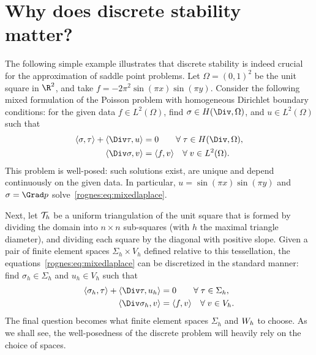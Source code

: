 \section{Why does discrete stability matter?}
\label{rognes:sec:motivation}

The following simple example illustrates that discrete stability is
indeed crucial for the approximation of saddle point problems. Let
$\Omega = (0, 1)^2$ be the unit square in $\R^2$, and take $f = - 2
\pi^2 \sin(\pi x) \sin(\pi y)$. Consider the following mixed
formulation of the Poisson problem with homogeneous Dirichlet boundary
conditions: for the given data $f \in L^2(\Omega)$, find $\sigma \in
H(\Div, \Omega)$, and $u \in L^2(\Omega)$ such that
\begin{equation}
  \label{rognes:eq:mixedlaplace}
  \begin{split}
    \langle \sigma, \tau \rangle + \langle \Div \tau, u \rangle &= 0
    \quad\quad \foralls \tau \in H(\Div, \Omega), \\
    \langle \Div \sigma, v \rangle &= \langle f, v \rangle
    \quad \foralls v \in L^2(\Omega).
  \end{split}
\end{equation}
This problem is well-posed: such solutions exist, are unique and
depend continuously on the given data. In particular, $u = \sin(\pi x)
\sin(\pi y)$ and $\sigma = \Grad p$
solve~\eqref{rognes:eq:mixedlaplace}.

Next, let $\mathcal{T}_h$ be a uniform triangulation of the unit square
that is formed by dividing the domain into $n \times n$ sub-squares
(with $h$ the maximal triangle diameter), and dividing each square by
the diagonal with positive slope. Given a pair of finite element
spaces $\Sigma_h \times V_h$ defined relative to this tessellation,
the equations~\eqref{rognes:eq:mixedlaplace} can be discretized in the
standard manner: find $\sigma_h \in \Sigma_h$ and $u_h \in V_h$ such
that
\begin{equation}
  \label{rognes:eq:mixedlaplace:discrete}
  \begin{split}
    \langle \sigma_h, \tau \rangle + \langle \Div \tau, u_h \rangle &= 0
    \quad\quad \foralls \tau \in \Sigma_h, \\
    \langle \Div \sigma_h, v \rangle &= \langle f, v \rangle
    \quad \foralls v \in V_h.
  \end{split}
\end{equation}
The final question becomes what finite element spaces $\Sigma_h$ and
$W_h$ to choose. As we shall see, the well-posedness of the discrete
problem will heavily rely on the choice of spaces.

